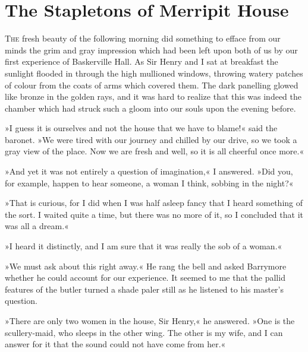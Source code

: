 \chapter{The Stapletons of Merripit House}
\lettrine[lines=4]{T}{he} fresh beauty of the following morning did something to efface from our minds the grim and gray impression which had been left upon both of us by our first experience of Baskerville Hall. As Sir Henry and I sat at breakfast the sunlight flooded in through the high mullioned windows, throwing watery patches of colour from the coats of arms which covered them. The dark panelling glowed like bronze in the golden rays, and it was hard to realize that this was indeed the chamber which had struck such a gloom into our souls upon the evening before.

»I guess it is ourselves and not the house that we have to blame!« said the baronet. »We were tired with our journey and chilled by our drive, so we took a gray view of the place. Now we are fresh and well, so it is all cheerful once more.«

»And yet it was not entirely a question of imagination,« I an\-swered. »Did you, for example, happen to hear someone, a woman I think, sobbing in the night?«

»That is curious, for I did when I was half asleep fancy that I heard something of the sort. I waited quite a time, but there was no more of it, so I concluded that it was all a dream.«

»I heard it distinctly, and I am sure that it was really the sob of a woman.«

»We must ask about this right away.« He rang the bell and asked Barrymore whether he could account for our experience. It seemed to me that the pallid features of the butler turned a shade paler still as he listened to his master's question.

»There are only two women in the house, Sir Henry,« he an\-swered. »One is the scullery-maid, who sleeps in the other wing. The other is my wife, and I can answer for it that the sound could not have come from her.«

